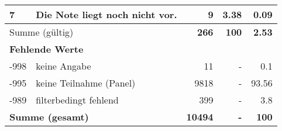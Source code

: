 \begin{longtable}{lXrrr}
     7 &
     \multicolumn{1}{X}{ Die Note liegt noch nicht vor.   } &


       \num{9} &
       \num[round-mode=places,round-precision=2]{3,38} &
         \num[round-mode=places,round-precision=2]{0,09} \\
     \midrule
     \multicolumn{2}{l}{Summe (gültig)} &
       \textbf{\num{266}} &
     \textbf{100} &
       \textbf{\num[round-mode=places,round-precision=2]{2,53}} \\
     \multicolumn{5}{l}{\textbf{Fehlende Werte}}\\
       -998 &
       keine Angabe &
         \num{11} &
        - &
         \num[round-mode=places,round-precision=2]{0,1} \\
       -995 &
       keine Teilnahme (Panel) &
         \num{9818} &
        - &
         \num[round-mode=places,round-precision=2]{93,56} \\
       -989 &
       filterbedingt fehlend &
         \num{399} &
        - &
         \num[round-mode=places,round-precision=2]{3,8} \\
     \midrule
     \multicolumn{2}{l}{\textbf{Summe (gesamt)}} &
          \textbf{\num{10494}} &
        \textbf{-} &
        \textbf{100} \\
     \bottomrule
     \end{longtable}
     
